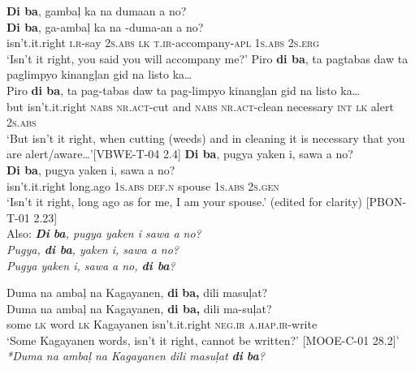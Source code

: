 \ea
\label{bkm:Ref441346257}
\textbf{Di ba},  gambaļ  ka  na  dumaan  a  no? \\\smallskip
\gll \textbf{Di ba},  ga-ambaļ  ka  na  \emptyset{}-duma-an  a  no? \\
isn't.it.right  \textsc{i.r}-say  2\textsc{s.abs}  \textsc{lk}  \textsc{t.ir}-accompany-\textsc{apl}  1\textsc{s.abs}  2\textsc{s.erg} \\
\glt ‘Isn’t it right, you said you will accompany me?’
\z
\ea
Piro  \textbf{di ba},  ta  pagtabas  daw  ta  paglimpyo  kinangļan  gid na  listo  ka… \\\smallskip
\gll Piro  \textbf{di ba},  ta  pag-tabas  daw  ta  pag-limpyo  kinangļan  gid na  listo  ka… \\
but  isn't.it.right  \textsc{nabs}  \textsc{nr.act}-cut  and  \textsc{nabs}  \textsc{nr.act}-clean  necessary  \textsc{int}
\textsc{lk}  alert   2\textsc{s.abs} \\
\glt ‘But isn’t it right, when cutting (weeds) and in cleaning it is necessary that you are alert/aware…’[VBWE-T-04 2.4]
\z
\ea
\label{bkm:Ref441346278}
\textbf{Di ba},  pugya  yaken  i,  sawa  a  no? \\\smallskip
\gll \textbf{Di ba},  pugya  yaken  i,  sawa  a  no? \\
isn't.it.right  long.ago 1\textsc{s.abs}  \textsc{def.n}  spouse  1\textsc{s.abs}  2\textsc{s.gen} \\
\glt ‘Isn’t it right, long ago as for me, I am your spouse.’ (edited for clarity) [PBON-T-01 2.23] \\\smallskip
Also:
\textit{\textbf{Di} \textbf{ba}, pugya yaken i sawa a no?} \\
\textit{Pugya, \textbf{di ba}, yaken i, sawa a no?} \\
\textit{Pugya yaken i, sawa a no, \textbf{di ba}?}
\z

\newpage
\ea
Duma  na  ambaļ  na  Kagayanen,  \textbf{di}  \textbf{ba,}  dili  masuļat? \\\smallskip
\gll Duma  na  ambaļ  na  Kagayanen,  \textbf{di ba,}  dili  ma-suļat? \\
some  \textsc{lk}  word  \textsc{lk}  Kagayanen  isn't.it.right  \textsc{neg.ir}  \textsc{a.hap.ir}-write \\
\glt ‘Some Kagayanen words, isn’t it right, cannot be written?’ [MOOE-C-01 28.2]’ \\\smallskip
\textit{*Duma na ambaļ na Kagayanen dili masuļat \textbf{di} \textbf{ba}?}
\z
